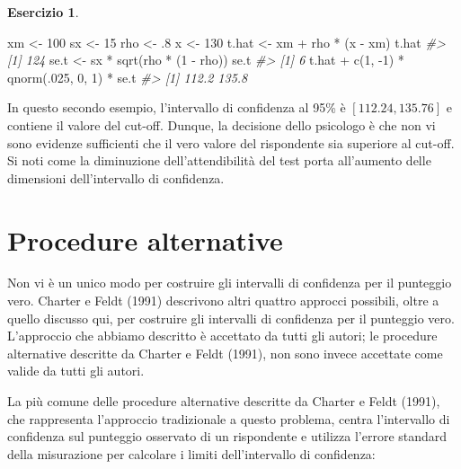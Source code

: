 \documentclass[
  11pt,
]{krantz}
\makeatletter
\newenvironment{Shaded}{\begin{snugshade}}{\end{snugshade}}
\newcommand{\CommentTok}[1]{\textcolor[rgb]{0.37,0.37,0.37}{\textit{#1}}}
\newcommand{\DecValTok}[1]{\textcolor[rgb]{0.06,0.06,0.06}{#1}}
\newcommand{\FunctionTok}[1]{\textcolor[rgb]{0,0,0}{#1}}
\newcommand{\NormalTok}[1]{#1}
\newcommand{\OtherTok}[1]{\textcolor[rgb]{0.37,0.37,0.37}{#1}}
\newcommand{\SpecialCharTok}[1]{\textcolor[rgb]{0,0,0}{#1}}
\newenvironment{kframe}{%
\medskip{}
\setlength{\fboxsep}{.8em}
 \def\at@end@of@kframe{}%
 \ifinner\ifhmode%
  \def\at@end@of@kframe{\end{minipage}}%
  \begin{minipage}{\columnwidth}%
 \fi\fi%
 \def\FrameCommand##1{\hskip\@totalleftmargin \hskip-\fboxsep
 \colorbox{shadecolor}{##1}\hskip-\fboxsep
     \hskip-\linewidth \hskip-\@totalleftmargin \hskip\columnwidth}%
 \MakeFramed {\advance\hsize-\width
   \@totalleftmargin\z@ \linewidth\hsize
   \@setminipage}}%
 {\par\unskip\endMakeFramed%
 \at@end@of@kframe}
\renewenvironment{Shaded}{\begin{kframe}}{\end{kframe}}
\theoremstyle{definition}
\theoremstyle{definition}
\theoremstyle{definition}
\newtheorem{exercise}{Esercizio}[chapter]
\theoremstyle{definition}
\theoremstyle{remark}
\makeatother
\begin{document}
\begin{exercise}
\begin{Shaded}
\begin{Highlighting}[]
\NormalTok{xm }\OtherTok{\textless{}{-}} \DecValTok{100}
\NormalTok{sx }\OtherTok{\textless{}{-}} \DecValTok{15}
\NormalTok{rho }\OtherTok{\textless{}{-}}\NormalTok{ .}\DecValTok{8}
\NormalTok{x }\OtherTok{\textless{}{-}} \DecValTok{130}
\NormalTok{t.hat }\OtherTok{\textless{}{-}}\NormalTok{ xm }\SpecialCharTok{+}\NormalTok{ rho }\SpecialCharTok{*}\NormalTok{ (x }\SpecialCharTok{{-}}\NormalTok{ xm)}
\NormalTok{t.hat}
\CommentTok{\#\textgreater{} [1] 124}
\NormalTok{se.t }\OtherTok{\textless{}{-}}\NormalTok{ sx }\SpecialCharTok{*} \FunctionTok{sqrt}\NormalTok{(rho }\SpecialCharTok{*}\NormalTok{ (}\DecValTok{1} \SpecialCharTok{{-}}\NormalTok{ rho))}
\NormalTok{se.t}
\CommentTok{\#\textgreater{} [1] 6}
\NormalTok{t.hat }\SpecialCharTok{+} \FunctionTok{c}\NormalTok{(}\DecValTok{1}\NormalTok{, }\SpecialCharTok{{-}}\DecValTok{1}\NormalTok{) }\SpecialCharTok{*} \FunctionTok{qnorm}\NormalTok{(.}\DecValTok{025}\NormalTok{, }\DecValTok{0}\NormalTok{, }\DecValTok{1}\NormalTok{) }\SpecialCharTok{*}\NormalTok{ se.t}
\CommentTok{\#\textgreater{} [1] 112.2 135.8}
\end{Highlighting}
\end{Shaded}

In questo secondo esempio, l'intervallo di confidenza al 95\% è \([112.24, 135.76]\) e contiene il valore del cut-off. Dunque, la decisione dello psicologo è che non vi sono evidenze sufficienti che il vero valore del rispondente sia superiore al cut-off. Si noti come la diminuzione dell'attendibilità del test porta all'aumento delle dimensioni dell'intervallo di confidenza.
\end{exercise}

\hypertarget{procedure-alternative}{%
\section{Procedure alternative}\label{procedure-alternative}}

Non vi è un unico modo per costruire gli intervalli di confidenza per il punteggio vero. Charter e Feldt (1991) descrivono altri quattro approcci possibili, oltre a quello discusso qui, per costruire gli intervalli di confidenza per il punteggio vero. L'approccio che abbiamo descritto è accettato da tutti gli autori; le procedure alternative descritte da Charter e Feldt (1991), non sono invece accettate come valide da tutti gli autori.

La più comune delle procedure alternative descritte da Charter e Feldt (1991), che rappresenta l'approccio tradizionale a questo problema, centra l'intervallo di confidenza sul punteggio osservato di un rispondente e utilizza l'errore standard della misurazione per calcolare i limiti dell'intervallo di confidenza:
\end{document}
